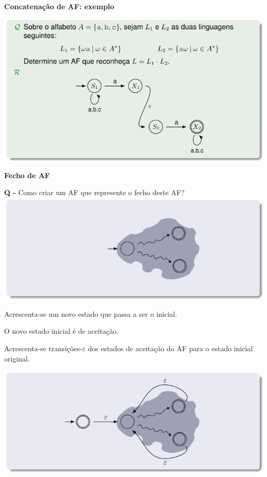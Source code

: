 \documentclass{article}
\begin{document}
\begin{flushleft}
  \textbf{Concatenação de AF: exemplo}

  \begin{center}
    \includegraphics[scale=0.4]{66}
  \end{center}
  \vspace{5mm}

  \textbf{Fecho de AF}

  \begin{center}
    \textbf{Q -} Como criar um AF que represente o fecho deste AF?
    \includegraphics[scale=0.4]{67}
  \end{center}

  \pagebreak

  \begin{center}
    Acrescenta-se um novo estado que passa a ser o inicial.

    O novo estado inicial é de aceitação.

    Acrescenta-se transições-$\varepsilon$ dos estados de aceitação do AF para o estado inicial original.

    \includegraphics[scale=0.4]{68}
  \end{center}


\end{flushleft}
\end{document}
